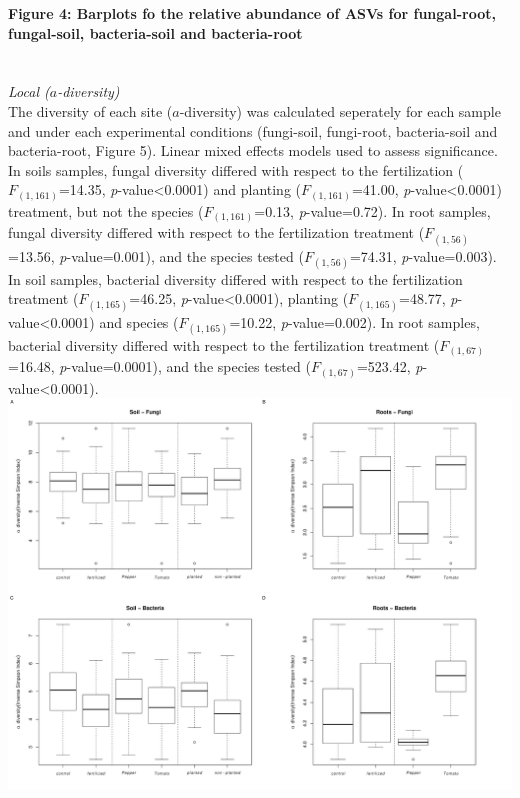 \documentclass[11pt,]{article}
\begin{document}
\textbf{Figure 4: Barplots fo the relative abundance of ASVs for
fungal-root, fungal-soil, bacteria-soil and bacteria-root}\\
\hspace*{0.333em}\\
\hspace*{0.333em}\\
\emph{Local (\(a\)-diversity)}\\
The diversity of each site (\(a\)-diversity) was calculated seperately
for each sample and under each experimental conditions (fungi-soil,
fungi-root, bacteria-soil and bacteria-root, Figure 5). Linear mixed
effects models used to assess significance. In soils samples, fungal
diversity differed with respect to the fertilization
(\(F_{(1,161)}\)=14.35, \emph{p}-value\textless{}0.0001) and planting
(\(F_{(1,161)}\)=41.00, \emph{p}-value\textless{}0.0001) treatment, but
not the species (\(F_{(1,161)}\)=0.13, \emph{p}-value=0.72). In root
samples, fungal diversity differed with respect to the fertilization
treatment (\(F_{(1,56)}\)=13.56, \emph{p}-value=0.001), and the species
tested (\(F_{(1,56)}\)=74.31, \emph{p}-value=0.003). In soil samples,
bacterial diversity differed with respect to the fertilization treatment
(\(F_{(1,165)}\)=46.25, \emph{p}-value\textless{}0.0001), planting
(\(F_{(1,165)}\)=48.77, \emph{p}-value\textless{}0.0001) and species
(\(F_{(1,165)}\)=10.22, \emph{p}-value=0.002). In root samples,
bacterial diversity differed with respect to the fertilization treatment
(\(F_{(1,67)}\)=16.48, \emph{p}-value=0.0001), and the species tested
(\(F_{(1,67)}\)=523.42, \emph{p}-value\textless{}0.0001). ~\\
\includegraphics[width=6.25000in]{../figures/Figure5_alpha.pdf}\\
\end{document}
